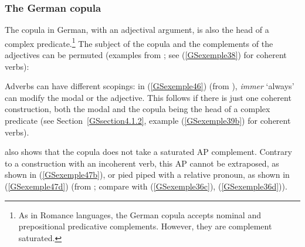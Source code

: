 {%


\subsubsection{The German copula}\label{GSsection4.1.3}

The copula in German, with an adjectival argument, is also the head of a complex predicate.\footnote{As in Romance languages, the German copula accepts nominal and prepositional predicative complements. However, they are complement saturated.} The subject of the copula and the complements of the adjectives can be permuted (examples from \citealt[68]{Mueller2002b}; see (\ref{GSexemple38}) for coherent verbs):

\eal 
	\label{GSexemple45} 
    \label{GSexemple45a}

	\label{GSexemple45b}
\zl

Adverbs can have different scopings: in (\ref{GSexemple46}) (from \citealt[68]{Mueller2002b}), \emph{immer} `always' can modify the modal or the adjective. This follows if there is just one coherent construction, both the modal and the copula being the head of a complex predicate (see Section~\ref{GSsection4.1.2}, example (\ref{GSexemple39b}) for coherent verbs).

\z

\cite{Mueller2002b} also shows that the copula does not take a saturated AP complement. Contrary to a construction with an incoherent verb, this AP cannot be extraposed, as shown in (\ref{GSexemple47b}), or pied piped with a relative pronoun, as shown in (\ref{GSexemple47d}) (from \citealt[70]{Mueller2002b}; compare with (\ref{GSexemple36c}), (\ref{GSexemple36d})).   

}
